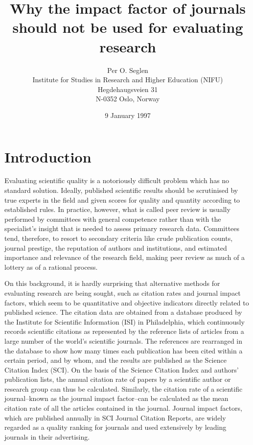 \documentclass[11pt, a4paper]{article}
\title{Why the impact factor of journals should not be used for evaluating research}
\author{
    Per O. Seglen \\
    Institute for Studies in Research and Higher Education (NIFU)\\
    Hegdehaugsveien 31\\
    N-0352 Oslo, Norway
}
\date{9 January 1997}
\begin{document}
\maketitle
\section*{Introduction}
Evaluating scientific quality is a notoriously difficult problem which has no standard solution.
Ideally, published scientific results should be scrutinised by true experts in the field and given
scores for quality and quantity according to established rules. In practice, however, what is called
peer review is usually performed by committees with general competence rather than with the
specialist's insight that is needed to assess primary research data. Committees tend, therefore,
to resort to secondary criteria like crude publication counts, journal prestige, the reputation of
authors and institutions, and estimated importance and relevance of the research field,
making peer review as much of a lottery as of a rational process.

On this background, it is hardly surprising that alternative methods for evaluating research are
being sought, such as citation rates and journal impact factors, which seem to be quantitative and
objective indicators directly related to published science. The citation data are obtained from a
database produced by the Institute for Scientific Information (ISI) in Philadelphia, which
continuously records scientific citations as represented by the reference lists of articles
from a large number of the world's scientific journals. The references are rearranged in the
database to show how many times each publication has been cited within a certain period,
and by whom, and the results are published as the Science Citation Index (SCI).
On the basis of the Science Citation Index and authors' publication lists, the annual
citation rate of papers by a scientific author or research group can thus be calculated.
Similarly, the citation rate of a scientific journal–known as the journal impact factor–can
be calculated as the mean citation rate of all the articles contained in the journal.
Journal impact factors, which are published annually in SCI Journal Citation Reports,
are widely regarded as a quality ranking for journals and used extensively by leading journals
in their advertising. 
\end{document}

